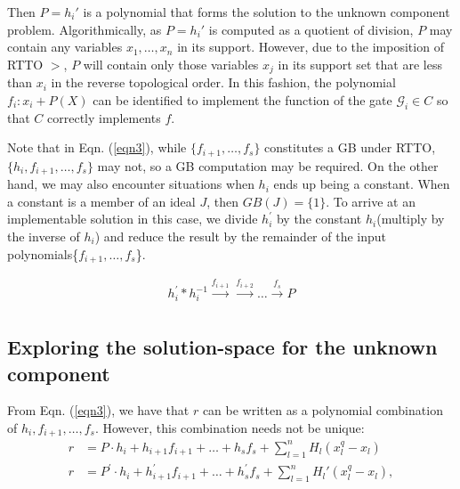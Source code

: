 Then $P = h_i'$ is a polynomial that forms the solution to the
unknown component problem. Algorithmically, as $P = h_i'$ is computed
as a quotient of division, $P$ may contain any variables
$x_1,\dots,x_n$ in its support. However, due to the imposition of RTTO
$>$, $P$ will contain only those variables $x_j$ in its support set
that are less than $x_i$ in the reverse topological order. In this
fashion, the polynomial $f_i: x_i + P(X)$ can be identified to
implement the function of the gate $\mathcal{G}_i \in C$ so that $C$
correctly implements $f$. 

Note that in Eqn. (\ref{eqn3}), while $\{f_{i+1},\dots,f_s\}$
constitutes a GB under RTTO, $\{h_i,f_{i+1},\dots,f_s\}$
may not, so a GB computation may be required. On the other hand, we
may also encounter situations when $h_i$ ends up being a constant.
When a constant is a member of an ideal $J$, then $GB(J) = \{1\}$. To
arrive at an implementable solution in this case, we divide $h_i^{'}$
by the constant $h_i$(multiply by the inverse of $h_i$) and reduce the result by
the remainder of the input polynomials\{$f_{i+1},\dots,f_s$\}.  

\begin{align}
h_i^{'}*h_i^{-1}\xrightarrow[]{f_{i+1}}\xrightarrow[]{f_{i+2}}\dots\xrightarrow[]{f_s}P
\end{align}
\vspace{-0.3in}
\subsection{Exploring the solution-space for the unknown component}
From Eqn. (\ref{eqn3}), we have that $r$ can be written as a
polynomial combination of $h_i,f_{i+1},\dots, f_s$. However, this
combination needs not be unique:
\begin{align*}
r &= P\cdot h_i+h_{i+1}f_{i+1}+\dots+h_sf_s+ \sum_{l=1}^n H_l (x_l^q-x_l)\\
r&= P^{'}\cdot h_i+h_{i+1}^{'}f_{i+1}+\dots+h_s^{'}f_s+\sum_{l=1}^n H_l' (x_l^q-x_l),
\end{align*}

